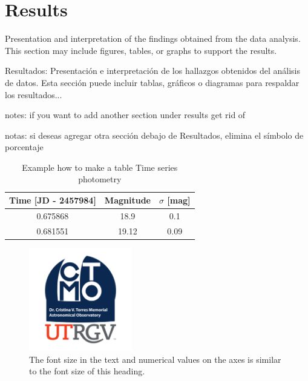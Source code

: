 \section{Results}

Presentation and interpretation of the findings obtained from the data analysis. This section may include figures, tables, or graphs to support the results.

Resultados: Presentación e interpretación de los hallazgos obtenidos del análisis de datos. Esta sección puede incluir tablas, gráficos o diagramas para respaldar los resultados... 

notes: if you want to add another section under results get rid of %

notas: si deseas agregar otra sección debajo de Resultados, elimina el símbolo de porcentaje %


\begin{table}[!htbp]
	\centering
	\begin{tabular}{c c c}
		\hline
		\hline
		Time [JD - 2457984] & Magnitude & $\sigma$ [mag] \\
		\hline
		0.675868 & 18.9 & 0.1 \\
		0.681551 & 19.12 & 0.09 \\
		\hline
		\hline
	\end{tabular}
	\caption{Example how to make a table Time series photometry}
	\label{tab:time_series_photometry_g}
\end{table}


\begin{figure}
 \centering
 \includegraphics[width=0.40\textwidth]{Images/ctmo-logo.png}
 \caption{The font size in the text and numerical values on the axes is similar to the font size of this heading.}
    \label{fig:ctmo}
\end{figure}
